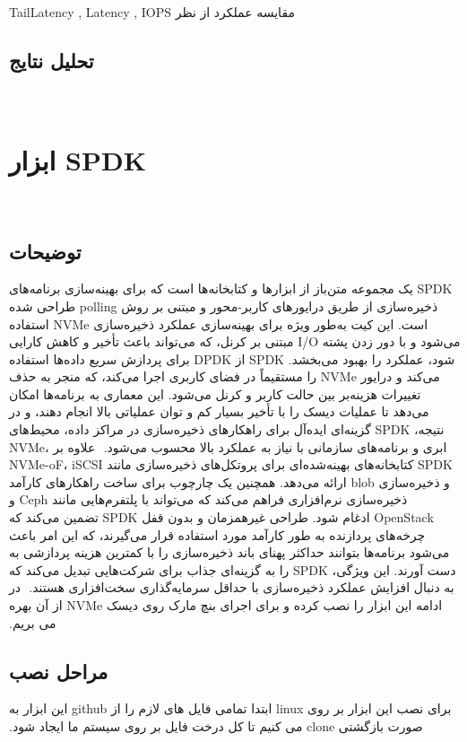 ‫
‫مقایسه عملکرد از نظر TailLatency , Latency , IOPS
‫
‫
‫‫\subsection*{تحلیل نتایج}
‫
‫
‫‫\section{ابزار SPDK}
‫‫\subsection*{توضیحات}
‫
‫SPDK یک مجموعه متن‌باز از ابزارها و کتابخانه‌ها است که برای بهینه‌سازی برنامه‌های ذخیره‌سازی از طریق درایورهای کاربر-محور و مبتنی بر روش polling طراحی شده است. این کیت به‌طور ویژه برای بهینه‌سازی عملکرد ذخیره‌سازی NVMe استفاده می‌شود و با دور زدن پشته I/O مبتنی بر کرنل، که می‌تواند باعث تأخیر و کاهش کارایی شود، عملکرد را بهبود می‌بخشد. SPDK از DPDK برای پردازش سریع داده‌ها استفاده می‌کند و درایور NVMe را مستقیماً در فضای کاربری اجرا می‌کند، که منجر به حذف تغییرات هزینه‌بر بین حالت کاربر و کرنل می‌شود. این معماری به برنامه‌ها امکان می‌دهد تا عملیات دیسک را با تأخیر بسیار کم و توان عملیاتی بالا انجام دهند، و در نتیجه، SPDK گزینه‌ای ایده‌آل برای راهکارهای ذخیره‌سازی در مراکز داده، محیط‌های ابری و برنامه‌های سازمانی با نیاز به عملکرد بالا محسوب می‌شود.
‫
‫علاوه بر NVMe، SPDK کتابخانه‌های بهینه‌شده‌ای برای پروتکل‌های ذخیره‌سازی مانند   NVMe-oF، iSCSI و ذخیره‌سازی blob ارائه می‌دهد. همچنین یک چارچوب برای ساخت راهکارهای کارآمد ذخیره‌سازی نرم‌افزاری فراهم می‌کند که می‌تواند با پلتفرم‌هایی مانند Ceph و OpenStack ادغام شود. طراحی غیرهمزمان و بدون قفل SPDK تضمین می‌کند که چرخه‌های پردازنده به طور کارآمد مورد استفاده قرار می‌گیرند، که این امر باعث می‌شود برنامه‌ها بتوانند حداکثر پهنای باند ذخیره‌سازی را با کمترین هزینه پردازشی به دست آورند. این ویژگی، SPDK را به گزینه‌ای جذاب برای شرکت‌هایی تبدیل می‌کند که به دنبال افزایش عملکرد ذخیره‌سازی با حداقل سرمایه‌گذاری سخت‌افزاری هستند.
‫
‫در ادامه این ابزار را نصب کرده و برای اجرای بنچ مارک روی دیسک NVMe از آن بهره می بریم.
‫
‫
‫
‫
‫
‫
‫
‫‫\subsection*{مراحل نصب}
‫برای نصب این ابزار بر روی linux ابتدا تمامی فایل های لازم را از github این ابزار به صورت بازگشتی clone می کنیم تا کل درخت فایل بر روی سیستم ما ایجاد شود.

